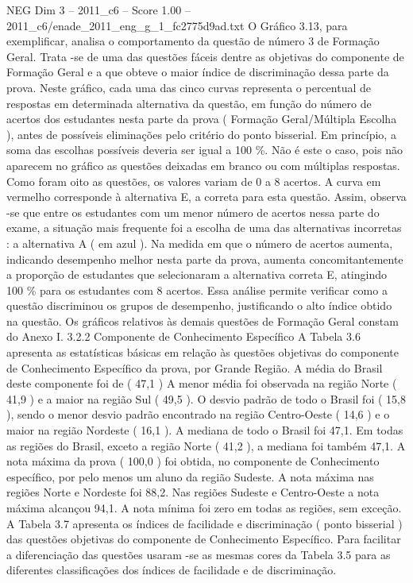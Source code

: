 \begin{textsample}{NEG Dim 3 – 2011\_c6 – Score 1.00 – 2011\_c6/enade\_2011\_eng\_g\_1\_fc2775d9ad.txt}
O Gráfico 3.13, para exemplificar, analisa o comportamento da questão de número 3 de Formação Geral.
Trata -se de uma das questões fáceis dentre as objetivas do componente de Formação Geral e a que obteve o maior índice de discriminação dessa parte da prova.
Neste gráfico, cada uma das cinco curvas representa o percentual de respostas em determinada alternativa da questão, em função do número de acertos dos estudantes nesta parte da prova ( Formação Geral/Múltipla Escolha ), antes de possíveis eliminações pelo critério do ponto bisserial.
Em princípio, a soma das escolhas possíveis deveria ser igual a 100 \%.
Não é este o caso, pois não aparecem no gráfico as questões deixadas em branco ou com múltiplas respostas.
Como foram oito as questões, os valores variam de 0 a 8 acertos.
A curva em vermelho corresponde à alternativa E, a correta para esta questão.
Assim, observa -se que entre os estudantes com um menor número de acertos nessa parte do exame, a situação mais frequente foi a escolha de uma das alternativas incorretas : a alternativa A ( em azul ).
Na medida em que o número de acertos aumenta, indicando desempenho melhor nesta parte da prova, aumenta concomitantemente a proporção de estudantes que selecionaram a alternativa correta E, atingindo 100 \% para os estudantes com 8 acertos.
Essa análise permite verificar como a questão discriminou os grupos de desempenho, justificando o alto índice obtido na questão.
Os gráficos relativos às demais questões de Formação Geral constam do Anexo I. 3.2.2 Componente de Conhecimento Específico A Tabela 3.6 apresenta as estatísticas básicas em relação às questões objetivas do componente de Conhecimento Específico da prova, por Grande Região.
A média do Brasil deste componente foi de ( 47,1 ) A menor média foi observada na região Norte ( 41,9 ) e a maior na região Sul ( 49,5 ).
O desvio padrão de todo o Brasil foi ( 15,8 ), sendo o menor desvio padrão encontrado na região Centro-Oeste ( 14,6 ) e o maior na região Nordeste ( 16,1 ).
A mediana de todo o Brasil foi 47,1.
Em todas as regiões do Brasil, exceto a região Norte ( 41,2 ), a mediana foi também 47,1.
A nota máxima da prova ( 100,0 ) foi obtida, no componente de Conhecimento específico, por pelo menos um aluno da região Sudeste.
A nota máxima nas regiões Norte e Nordeste foi 88,2.
Nas regiões Sudeste e Centro-Oeste a nota máxima alcançou 94,1.
A nota mínima foi zero em todas as regiões, sem exceção.
A Tabela 3.7 apresenta os índices de facilidade e discriminação ( ponto bisserial ) das questões objetivas do componente de Conhecimento Específico.
Para facilitar a diferenciação das questões usaram -se as mesmas cores da Tabela 3.5 para as diferentes classificações dos índices de facilidade e de discriminação.

\end{textsample}

